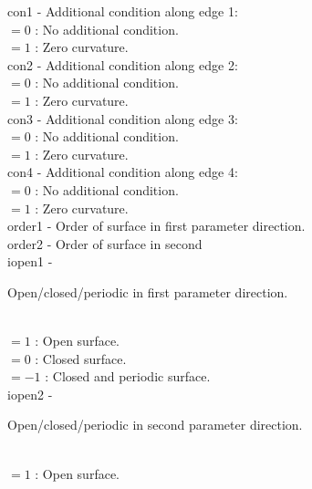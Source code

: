         \>\>    {\fov con1} \> - \> Additional condition along edge 1:\\
                      \>\>\>\>\> $= 0$ : No additional condition.\\
                      \>\>\>\>\> $= 1$ : Zero curvature.\\
        \>\>    {\fov con2} \> - \> Additional condition along edge 2:\\
                      \>\>\>\>\> $= 0$ : No additional condition.\\
                      \>\>\>\>\> $= 1$ : Zero curvature.\\
        \>\>    {\fov con3} \> - \> Additional condition along edge 3:\\
                      \>\>\>\>\> $= 0$ : No additional condition.\\
                      \>\>\>\>\> $= 1$ : Zero curvature.\\
        \>\>    {\fov con4} \> - \> Additional condition along edge 4:\\
                      \>\>\>\>\> $= 0$ : No additional condition.\\
                      \>\>\>\>\> $= 1$ : Zero curvature.\\
        \>\>    {\fov order1}\> - \> Order of surface in first parameter
                                     direction.\\
        \>\>    {\fov order2}\> - \> Order of surface in second\\
        \>\>    {\fov iopen1}\> - \>
                     \begin{minipg2}
                       Open/closed/periodic in first parameter direction.
                     \end{minipg2}\\
                      \>\>\>\> $= 1$ \> : Open surface.\\
                      \>\>\>\> $= 0$ \> : Closed surface.\\
                      \>\>\>\> $= -1$ \> : Closed and periodic
                      surface.\\
\newpagetabs
        \>\>    {\fov iopen2}\> - \>
                     \begin{minipg2}
                       Open/closed/periodic in second parameter direction.
                     \end{minipg2}\\
                      \>\>\>\> $= 1$ \> : Open surface.\\
